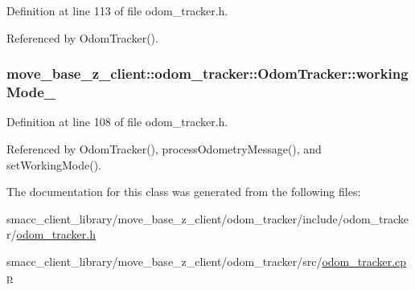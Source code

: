 Definition at line 113 of file odom\+\_\+tracker.\+h.



Referenced by Odom\+Tracker().

\subsubsection[{\texorpdfstring{working\+Mode\+\_\+}{workingMode_}}]{ move\+\_\+base\+\_\+z\+\_\+client\+::odom\+\_\+tracker\+::\+Odom\+Tracker\+::working\+Mode\+\_\+\hspace{0.3cm}{\ttfamily [protected]}}\hypertarget{classmove__base__z__client_1_1odom__tracker_1_1OdomTracker_a39c97d7bf6003fde62e0bed1a221e3f0}{}\label{classmove__base__z__client_1_1odom__tracker_1_1OdomTracker_a39c97d7bf6003fde62e0bed1a221e3f0}


Definition at line 108 of file odom\+\_\+tracker.\+h.



Referenced by Odom\+Tracker(), process\+Odometry\+Message(), and set\+Working\+Mode().



The documentation for this class was generated from the following files\+:\begin{DoxyCompactItemize}
\item 
smacc\+\_\+client\+\_\+library/move\+\_\+base\+\_\+z\+\_\+client/odom\+\_\+tracker/include/odom\+\_\+tracker/\hyperlink{odom__tracker_8h}{odom\+\_\+tracker.\+h}\item 
smacc\+\_\+client\+\_\+library/move\+\_\+base\+\_\+z\+\_\+client/odom\+\_\+tracker/src/\hyperlink{odom__tracker_8cpp}{odom\+\_\+tracker.\+cpp}\end{DoxyCompactItemize}
